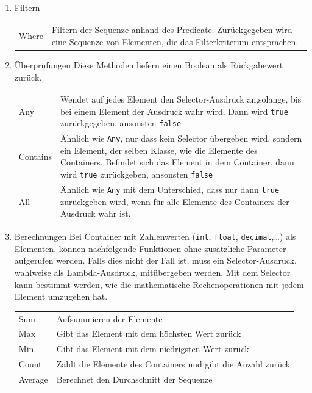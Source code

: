 \documentclass[11pt]{article}
\begin{document}
\begin{enumerate}
\item Filtern
\label{sec:orgheadline43}
\begin{center}
\begin{tabular}{ll}
Where & Filtern der Sequenze anhand des Predicate. Zurückgegeben wird eine Sequenze von Elementen, die das Filterkriterum entsprachen.\\
\end{tabular}
\end{center}
\item Überprüfungen
\label{sec:orgheadline44}
Diese Methoden liefern einen Boolean als Rückgabewert zurück.
\begin{center}
\begin{tabular}{ll}
Any & Wendet auf jedes Element den Selector-Ausdruck an,solange, bis bei einem Element der Ausdruck wahr wird. Dann wird \texttt{true} zurückgegeben, ansonsten \texttt{false}\\
Contains & Ähnlich wie \texttt{Any}, nur dass kein Selector übergeben wird, sondern ein Element, der selben Klasse, wie die Elemente des Containers. Befindet sich das Element in dem Container, dann wird \texttt{true} zurückgeben, ansonsten \texttt{false}\\
All & Ähnlich wie \texttt{Any} mit dem Unterschied, dass nur dann \texttt{true} zurückgeben wird, wenn für alle Elemente des Containers der Ausdruck wahr ist.\\
\end{tabular}
\end{center}
\item Berechnungen
\label{sec:orgheadline45}
Bei Container mit Zahlenwerten (\texttt{int}, \texttt{float}, \texttt{decimal},\ldots{}) als Elementen,
können nachfolgende Funktionen ohne zusätzliche Parameter aufgerufen werden.
Falls dies nicht der Fall ist, muss ein Selector-Ausdruck, wahlweise als
Lambda-Ausdruck, mitübergeben werden. Mit dem Selector kann bestimmt werden, wie
die mathematische Rechenoperationen mit jedem Element umzugehen hat.
\begin{center}
\begin{tabular}{ll}
Sum & Aufsummieren der Elemente\\
Max & Gibt das Element mit dem höchsten Wert zurück\\
Min & Gibt das Element mit dem niedrigsten Wert zurück\\
Count & Zählt die Elemente des Containers und gibt die Anzahl zurück\\
Average & Berechnet den Durchschnitt der Sequenze\\

\end{tabular}
\end{center}
\end{enumerate}
\end{document}
